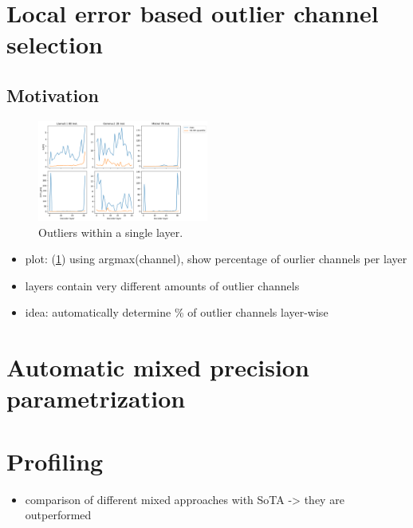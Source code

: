 \section{Local error based outlier channel selection}
\subsection{Motivation}
\begin{figure}
\centering
\includegraphics[width=0.5\textwidth]{figures/plot_outlier_layers}
\caption{Outliers within a single layer.}
\label{fig:plot_outlier_layers}
\end{figure}

\begin{itemize}
	\item plot: (\ref{fig:plot_outlier_layers}) using argmax(channel), show percentage of ourlier channels per layer
    \item layers contain very different amounts of outlier channels
    \item idea: automatically determine \% of outlier channels layer-wise
\end{itemize}


\section{Automatic mixed precision parametrization}

\section{Profiling}
\begin{itemize}
	\item comparison of different mixed approaches with SoTA -> they are outperformed
\end{itemize}
